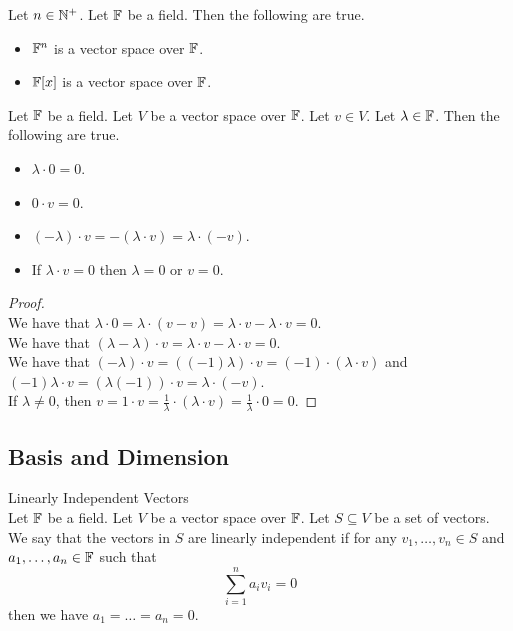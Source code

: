 \documentclass[a4paper]{article}
\begin{document}
\begin{eg}{}{} Let $n\in\mathbb{N}^+$. Let $\mathbb{F}$ be a field. Then the following are true. 
\begin{itemize}
\item $\mathbb{F}^n$ is a vector space over $\mathbb{F}$. 
\item $\mathbb{F}[x]$ is a vector space over $\mathbb{F}$. 
\end{itemize}
\end{eg}

\begin{lmm}{}{} Let $\mathbb{F}$ be a field. Let $V$ be a vector space over $\mathbb{F}$. Let $v\in V$. Let $\lambda\in\mathbb{F}$. Then the following are true. 
\begin{itemize}
\item $\lambda\cdot 0=0$. 
\item $0\cdot v=0$. 
\item $(-\lambda)\cdot v=-(\lambda\cdot v)=\lambda\cdot(-v)$. 
\item If $\lambda\cdot v=0$ then $\lambda=0$ or $v=0$. 
\end{itemize}
\begin{proof}\\
We have that $\lambda\cdot 0=\lambda\cdot(v-v)=\lambda\cdot v-\lambda\cdot v=0$. \\

We have that $(\lambda-\lambda)\cdot v=\lambda\cdot v-\lambda\cdot v=0$. \\

We have that $(-\lambda)\cdot v=((-1)\lambda)\cdot v=(-1)\cdot(\lambda\cdot v)$ and $(-1)\lambda\cdot v=(\lambda(-1))\cdot v=\lambda\cdot(-v)$. \\

If $\lambda\neq 0$, then $v=1\cdot v=\frac{1}{\lambda}\cdot(\lambda\cdot v)=\frac{1}{\lambda}\cdot 0=0$. 
\end{proof}
\end{lmm}

\subsection{Basis and Dimension}
\begin{defn}{Linearly Independent Vectors}{}\\
Let $\mathbb{F}$ be a field. Let $V$ be a vector space over $\mathbb{F}$. Let $S\subseteq V$ be a set of vectors. We say that the vectors in $S$ are linearly independent if for any $v_1,\dots,v_n\in S$ and $a_1,\dots,a_n\in\mathbb{F}$ such that $$\sum_{i=1}^na_iv_i=0$$ then we have $a_1=\dots=a_n=0$. 
\end{defn}
\end{document}
